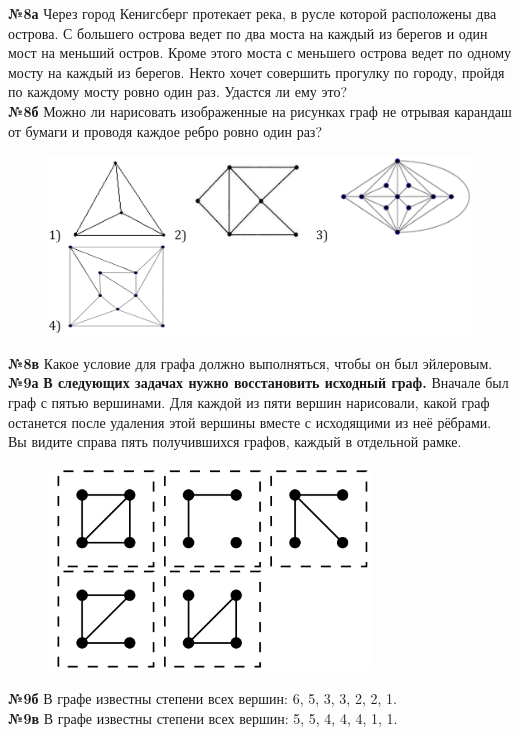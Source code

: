 \documentclass[12 pt, a4paper]{article}%
\newcommand{\task}[1]{{{\vspace{0.6cm} \vspace{-2ex} \textbf{№{#1}}  }}}
\begin{document}
	\task{8а} Через город Кенигсберг протекает река, в русле которой расположены два
	острова. С большего острова ведет по два моста на каждый из
	берегов и один мост на меньший остров. Кроме этого
	моста с меньшего острова ведет по одному мосту на
	каждый из берегов. Некто хочет совершить прогулку по
	городу, пройдя по каждому мосту ровно один раз. Удастся ли ему это?\\
	\task{8б} Можно ли нарисовать изображенные на рисунках граф не отрывая карандаш от бумаги и проводя каждое ребро ровно один раз?\\
	\begin{center}
		\begin{figure}[h]
			\includegraphics[width=\linewidth]{pic.png}
		\end{figure}
	\end{center}
	\vspace{-6ex}
	\task{8в} Какое условие для графа должно выполняться, чтобы он был эйлеровым.\\
	\task{9а} \textbf{В следующих задачах нужно восстановить исходный граф.} Вначале был граф с пятью вершинами. Для каждой из пяти вершин нарисовали,
	какой граф останется после удаления этой вершины вместе с исходящими из неё рёбрами. Вы видите
	справа пять получившихся графов, каждый в отдельной рамке.\\
	\begin{center}
		\begin{figure}[h]
			\centering
			\includegraphics[width=0.33\linewidth]{pic2.png}
		\end{figure}
	\end{center}
	\vspace{-6ex}
	\task{9б} В графе известны степени всех вершин: 6, 5, 3, 3, 2, 2, 1. \\
	\task{9в} В графе известны степени всех вершин: 5, 5, 4, 4, 4, 1, 1. \\
\end{document}
